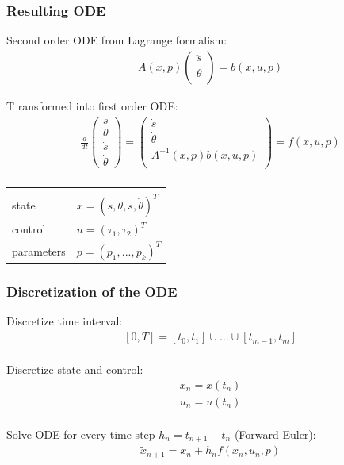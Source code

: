 \documentclass{beamer}
\begin{document}
\begin{frame}[c]
	\frametitle{Resulting ODE}
	
	Second order ODE from Lagrange formalism:
	\begin{align*}
	  &A(x,p)
	  \begin{pmatrix} 
	    \ddot{s} \\ \ddot{\theta} \\
	  \end{pmatrix}
	  = b(x,u,p)
	\end{align*}
	
	T	ransformed into first order ODE:
	\begin{align*}
	  &\frac{d}{dt}
	  \begin{pmatrix}
	  s \\ \theta \\ \dot{s} \\ \dot{\theta}
	  \end{pmatrix}
	  =
	  \begin{pmatrix}
	    \dot{s} \\ \dot{\theta} \\ A^{-1}(x,p)b(x,u,p) \\
	  \end{pmatrix} 
	  = f(x,u,p) \\
	\end{align*}
	
	\vspace{-1.0cm}
	
	\begin{tabular}{ll}
	  & \\
	  state & $ x = (s,\theta,\dot{s},\dot{\theta})^T $ \\
	  control & $ u = (\tau_1,\tau_2)^T $ \\
	  parameters & $ p = (p_1,...,p_k)^T $ \\
	\end{tabular}
\end{frame}

\begin{frame}
	\frametitle{Discretization of the ODE}
	
	Discretize time interval:
	\begin{align*}
	  &[0,T] = [t_0,t_1] \cup \ldots \cup [t_{m-1},t_m] \\
	\end{align*}
	
	Discretize state and control:
	\begin{align*}
	  &x_n = x(t_n) \\
	  &u_n = u(t_n) \\
	\end{align*}
	
	Solve ODE for every time step $h_n=t_{n+1}-t_n$ (Forward Euler):
	\begin{align*}
	  &\tilde{x}_{n+1} = x_n + h_n f(x_n,u_n,p) \\
	\end{align*}
\end{frame}
\end{document}
